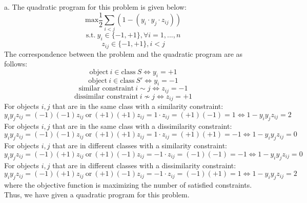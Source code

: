 \documentclass[oneside]{projectpaper} %
\begin{document}
{\large a.} The quadratic program for this problem is given below:
$$\text{max}\frac{1}{2}\sum\limits_{i<j}(1 -(y_i \cdot y_j \cdot z_{ij}))$$
$$\text{s.t.} \ y_i \in \{-1, +1\}, \forall i = 1,...,n$$
$$z_{ij} \in \{-1, +1\}, i < j$$
The correspondence between the problem and the quadratic program are as follows:
$$\text{object} \ i \in \text{class} \ S \Leftrightarrow y_i = +1$$
$$\text{object} \ i \in \text{class} \ S' \Leftrightarrow y_i = -1$$
$$\text{similar constraint} \ i \sim j \Leftrightarrow z_{ij} = -1$$
$$\text{dissimilar constraint} \ i \nsim j \Leftrightarrow z_{ij} = +1$$ 
\newline
For objects $i, j$ that are in the same class with a similarity constraint: $$y_i y_j z_{ij} = (-1)(-1)z_{ij} \ \text{or} \ (+1)(+1)z_{ij} = 1 \cdot z_{ij} = (+1)(-1) = 1 \Leftrightarrow 1 - y_i y_j z_{ij} = 2$$
For objects $i, j$ that are in the same class with a dissimilarity constraint: $$y_i y_j z_{ij} = (-1)(-1)z_{ij} \ \text{or} \ (+1)(+1)z_{ij} = 1 \cdot z_{ij} = (+1)(+1) = -1 \Leftrightarrow 1 - y_i y_j z_{ij} = 0$$
For objects $i, j$ that are in different classes with a similarity constraint: $$y_i y_j z_{ij} = (-1)(+1)z_{ij} \ \text{or} \ (+1)(-1)z_{ij} = -1 \cdot z_{ij} = (-1)(-1) = -1 \Leftrightarrow 1 - y_i y_j z_{ij} = 0$$
For objects $i, j$ that are in different classes with a dissimilarity constraint: $$y_i y_j z_{ij} = (-1)(+1)z_{ij} \ \text{or} \ (+1)(-1)z_{ij} = -1 \cdot z_{ij} = (-1)(+1) = 1 \Leftrightarrow 1 - y_i y_j z_{ij} = 2$$
where the objective function is maximizing the number of satisfied constraints. \newline
Thus, we have given a quadratic program for this problem.
\newline
\newline
\end{document}

